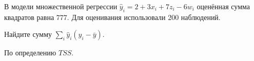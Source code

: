 
\begin{question}
В модели множественной регрессии \(\hat y_i = 2 + 3 x_i + 7 z_i -6 w_i\) оценённая сумма квадратов равна \(777\).
Для оценивания использовали 200 наблюдений.

Найдите сумму \(\sum_i \hat y_i (\hat y_i - \bar y)\).
\end{question}

\begin{solution}
По определению \(TSS\).
\end{solution}

